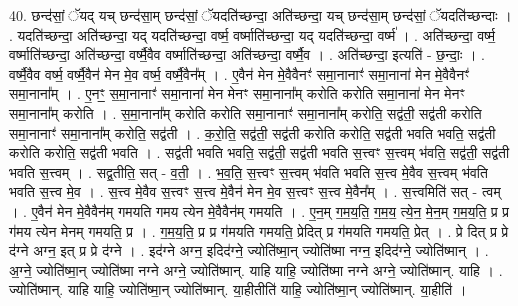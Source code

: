 \documentclass[17pt]{extarticle}
\begin{document}
40. छन्द॑सां॒ ॅयद् यच् छन्द॑सा॒म् छन्द॑सां॒ ॅयदति॑च्छन्दा॒ अति॑च्छन्दा॒ यच् छन्द॑सा॒म् छन्द॑सां॒ ॅयदति॑च्छन्दाः । . यदति॑च्छन्दा॒ अति॑च्छन्दा॒ यद् यदति॑च्छन्दा॒ वर्ष्म॒ वर्ष्माति॑च्छन्दा॒ यद् यदति॑च्छन्दा॒ वर्ष्म॑ । . अति॑च्छन्दा॒ वर्ष्म॒ वर्ष्माति॑च्छन्दा॒ अति॑च्छन्दा॒ वर्ष्मै॒वैव वर्ष्माति॑च्छन्दा॒ अति॑च्छन्दा॒ वर्ष्मै॒व । . अति॑च्छन्दा॒ इत्यति॑ - छ॒न्दाः॒ । . वर्ष्मै॒वैव वर्ष्म॒ वर्ष्मै॒वैन॑ मेन मे॒व वर्ष्म॒ वर्ष्मै॒वैन᳚म् । . ए॒वैन॑ मेन मे॒वैवैनꣳ॑ समा॒नानाꣳ॑ समा॒नाना॑ मेन मे॒वैवैनꣳ॑ समा॒नाना᳚म् । . ए॒नꣳ॒॒ स॒मा॒नानाꣳ॑ समा॒नाना॑ मेन मेनꣳ समा॒नाना᳚म् करोति करोति समा॒नाना॑ मेन मेनꣳ समा॒नाना᳚म् करोति । . स॒मा॒नाना᳚म् करोति करोति समा॒नानाꣳ॑ समा॒नाना᳚म् करोति॒ सद्व॑ती॒ सद्व॑ती करोति समा॒नानाꣳ॑ समा॒नाना᳚म् करोति॒ सद्व॑ती । . क॒रो॒ति॒ सद्व॑ती॒ सद्व॑ती करोति करोति॒ सद्व॑ती भवति भवति॒ सद्व॑ती करोति करोति॒ सद्व॑ती भवति । . सद्व॑ती भवति भवति॒ सद्व॑ती॒ सद्व॑ती भवति स॒त्त्वꣳ स॒त्त्वम् भ॑वति॒ सद्व॑ती॒ सद्व॑ती भवति स॒त्त्वम् । . सद्व॒तीति॒ सत् - व॒ती॒ । . भ॒व॒ति॒ स॒त्त्वꣳ स॒त्त्वम् भ॑वति भवति स॒त्त्व मे॒वैव स॒त्त्वम् भ॑वति भवति स॒त्त्व मे॒व । . स॒त्त्व मे॒वैव स॒त्त्वꣳ स॒त्त्व मे॒वैन॑ मेन मे॒व स॒त्त्वꣳ स॒त्त्व मे॒वैन᳚म् । . स॒त्त्वमिति॑ सत् - त्वम् । . ए॒वैन॑ मेन मे॒वैवैन॑म् गमयति गमय त्येन मे॒वैवैन॑म् गमयति । . ए॒न॒म् ग॒म॒य॒ति॒ ग॒म॒य॒ त्ये॒न॒ मे॒न॒म् ग॒म॒य॒ति॒ प्र प्र ग॑मय त्येन मेनम् गमयति॒ प्र । . ग॒म॒य॒ति॒ प्र प्र ग॑मयति गमयति॒ प्रेदित् प्र ग॑मयति गमयति॒ प्रेत् । . प्रे दित् प्र प्रे द॑ग्ने अग्न॒ इत् प्र प्रे द॑ग्ने । . इद॑ग्ने अग्न॒ इदिद॑ग्ने॒ ज्योति॑ष्मा॒न् ज्योति॑ष्मा नग्न॒ इदिद॑ग्ने॒ ज्योति॑ष्मान् । . अ॒ग्ने॒ ज्योति॑ष्मा॒न् ज्योति॑ष्मा नग्ने अग्ने॒ ज्योति॑ष्मान्. याहि याहि॒ ज्योति॑ष्मा नग्ने अग्ने॒ ज्योति॑ष्मान्. याहि । . ज्योति॑ष्मान्. याहि याहि॒ ज्योति॑ष्मा॒न् ज्योति॑ष्मान्. या॒हीतीति॑ याहि॒ ज्योति॑ष्मा॒न् ज्योति॑ष्मान्. या॒हीति॑ । \newline
\pagebreak
{}
\end{document}
